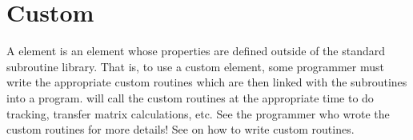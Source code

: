 %
%

\section{Custom}
\label{s:custom}

A  element is an element whose properties are defined outside of the standard \bmad
subroutine library. That is, to use a custom element, some programmer must write the appropriate
custom routines which are then linked with the \bmad subroutines into a program. \bmad will call the
custom routines at the appropriate time to do tracking, transfer matrix calculations, etc. See the
programmer who wrote the custom routines for more details! See  on how to write
custom routines.

